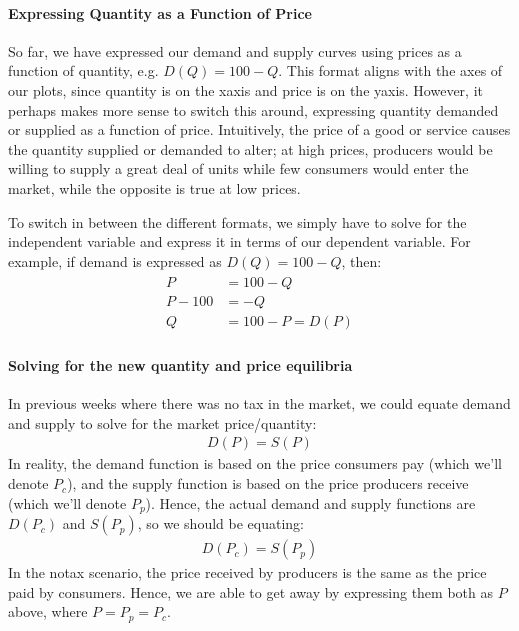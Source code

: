 \documentclass[letterpaper,10pt,english]{jupyterBook}
\begin{document}
\paragraph{Expressing Quantity as a Function of Price}
\label{\detokenize{content/03-public/taxes-subsidies:expressing-quantity-as-a-function-of-price}}
\sphinxAtStartPar
So far, we have expressed our demand and supply curves using prices as a function of quantity, e.g. \(D(Q) = 100 - Q\). This format aligns with the axes of our plots, since quantity is on the x\sphinxhyphen{}axis and price is on the y\sphinxhyphen{}axis. However, it perhaps makes more sense to switch this around, expressing quantity demanded or supplied as a function of price. Intuitively, the price of a good or service causes the quantity supplied or demanded to alter; at high prices, producers would be willing to supply a great deal of units while few consumers would enter the market, while the opposite is true at low prices.

\sphinxAtStartPar
To switch in between the different formats, we simply have to solve for the independent variable and express it in terms of our dependent variable. For
example, if demand is expressed as \(D(Q) = 100 - Q\), then:
\begin{equation*}
\begin{split}
\begin{align*}
P &= 100 - Q \\
P - 100 &= -Q \\
Q &= 100 - P = D(P)
\end{align*}
\end{split}
\end{equation*}

\paragraph{Solving for the new quantity and price equilibria}
\label{\detokenize{content/03-public/taxes-subsidies:solving-for-the-new-quantity-and-price-equilibria}}
\sphinxAtStartPar
In previous weeks where there was no tax in the market, we could equate demand and supply to solve for the market price/quantity:
\begin{equation*}
\begin{split}D(P) = S(P)\end{split}
\end{equation*}
\sphinxAtStartPar
In reality, the demand function is based on the price consumers pay (which we’ll denote \(P_c\)), and the supply function is based on the price producers receive (which we’ll denote \(P_p\)). Hence, the actual demand and supply functions are \(D(P_c)\) and \(S(P_p)\), so we should be equating:
\begin{equation*}
\begin{split}D(P_c) = S(P_p)\end{split}
\end{equation*}
\sphinxAtStartPar
In the no\sphinxhyphen{}tax scenario, the price received by producers is the same as the price paid by consumers. Hence, we are able to get away by expressing them both as \(P\) above, where \(P=P_p=P_c\).
\end{document}
